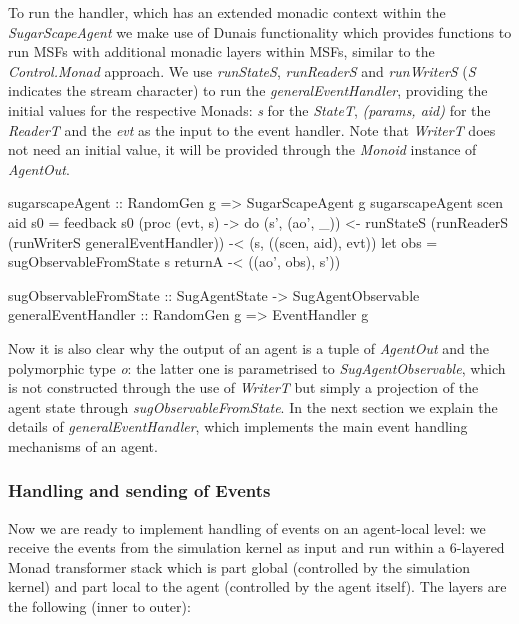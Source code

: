 To run the handler, which has an extended monadic context within the \textit{SugarScapeAgent} we make use of Dunais functionality which provides functions to run MSFs with additional monadic layers within MSFs, similar to the \textit{Control.Monad} approach. We use \textit{runStateS}, \textit{runReaderS} and \textit{runWriterS} (\textit{S} indicates the stream character) to run the \textit{generalEventHandler}, providing the initial values for the respective Monads: \textit{s} for the \textit{StateT}, \textit{(params, aid)} for the \textit{ReaderT} and the \textit{evt} as the input to the event handler. Note that \textit{WriterT} does not need an initial value, it will be provided through the \textit{Monoid} instance of \textit{AgentOut}.

\begin{HaskellCode}
sugarscapeAgent :: RandomGen g => SugarScapeAgent g
sugarscapeAgent scen aid s0 = feedback s0 (proc (evt, s) -> do
  (s', (ao', _)) <- runStateS 
                      (runReaderS 
                        (runWriterS generalEventHandler)) -< (s, ((scen, aid), evt))
  let obs = sugObservableFromState s
  returnA -< ((ao', obs), s'))

sugObservableFromState :: SugAgentState -> SugAgentObservable
generalEventHandler :: RandomGen g => EventHandler g
\end{HaskellCode}

Now it is also clear why the output of an agent is a tuple of \textit{AgentOut} and the polymorphic type \textit{o}: the latter one is parametrised to \textit{SugAgentObservable}, which is not constructed through the use of \textit{WriterT} but simply a projection of the agent state through \textit{sugObservableFromState}. In the next section we explain the details of \textit{generalEventHandler}, which implements the main event handling mechanisms of an agent.

\subsubsection{Handling and sending of Events}
Now we are ready to implement handling of events on an agent-local level: we receive the events from the simulation kernel as input and run within a 6-layered Monad transformer stack which is part global (controlled by the simulation kernel) and part local to the agent (controlled by the agent itself). The layers are the following (inner to outer):

